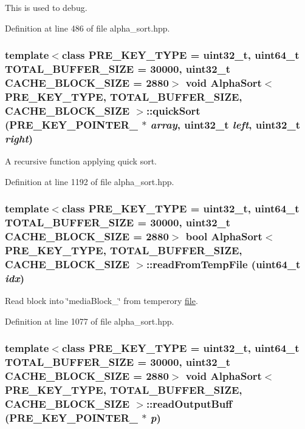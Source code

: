 This is used to debug. 

Definition at line 486 of file alpha\_\-sort.hpp.\hypertarget{classAlphaSort_65137c8d2f24860c174d54919b383eae}{
\subsubsection[{quickSort}]{\setlength{\rightskip}{0pt plus 5cm}template$<$class PRE\_\-KEY\_\-TYPE  = uint32\_\-t, uint64\_\-t TOTAL\_\-BUFFER\_\-SIZE = 30000, uint32\_\-t CACHE\_\-BLOCK\_\-SIZE = 2880$>$ void {\bf AlphaSort}$<$ PRE\_\-KEY\_\-TYPE, TOTAL\_\-BUFFER\_\-SIZE, CACHE\_\-BLOCK\_\-SIZE $>$::quickSort (PRE\_\-KEY\_\-POINTER\_\- $\ast$ {\em array}, \/  uint32\_\-t {\em left}, \/  uint32\_\-t {\em right})}}
\label{classAlphaSort_65137c8d2f24860c174d54919b383eae}


A recursive function applying quick sort. 

Definition at line 1192 of file alpha\_\-sort.hpp.\hypertarget{classAlphaSort_38b114d442b10b78e5fd80464bde4dc4}{
\subsubsection[{readFromTempFile}]{\setlength{\rightskip}{0pt plus 5cm}template$<$class PRE\_\-KEY\_\-TYPE  = uint32\_\-t, uint64\_\-t TOTAL\_\-BUFFER\_\-SIZE = 30000, uint32\_\-t CACHE\_\-BLOCK\_\-SIZE = 2880$>$ bool {\bf AlphaSort}$<$ PRE\_\-KEY\_\-TYPE, TOTAL\_\-BUFFER\_\-SIZE, CACHE\_\-BLOCK\_\-SIZE $>$::readFromTempFile (uint64\_\-t {\em idx})}}
\label{classAlphaSort_38b114d442b10b78e5fd80464bde4dc4}


Read block into \char`\"{}mediaBlock\_\-\char`\"{} from temperory \hyperlink{classfile}{file}. 

Definition at line 1077 of file alpha\_\-sort.hpp.\hypertarget{classAlphaSort_c96276a8cfb47303925238b27b08de47}{
\subsubsection[{readOutputBuff}]{\setlength{\rightskip}{0pt plus 5cm}template$<$class PRE\_\-KEY\_\-TYPE  = uint32\_\-t, uint64\_\-t TOTAL\_\-BUFFER\_\-SIZE = 30000, uint32\_\-t CACHE\_\-BLOCK\_\-SIZE = 2880$>$ void {\bf AlphaSort}$<$ PRE\_\-KEY\_\-TYPE, TOTAL\_\-BUFFER\_\-SIZE, CACHE\_\-BLOCK\_\-SIZE $>$::readOutputBuff (PRE\_\-KEY\_\-POINTER\_\- $\ast$ {\em p})}}
\label{classAlphaSort_c96276a8cfb47303925238b27b08de47}


